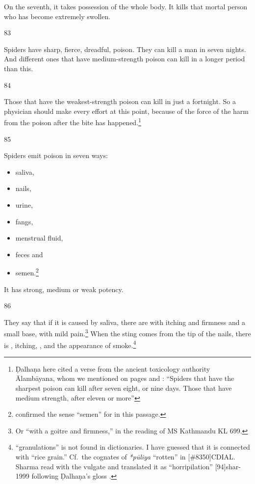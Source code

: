 \begin{translation}
On the seventh, it takes possession of the whole body. It kills that mortal person 
who has become extremely swollen. 
    
\item[83]

Spiders have sharp, fierce, dreadful,   poison.  They can kill a man in seven 
nights.
And different ones that have medium-strength poison can kill in a longer period 
than this. 
    
\item[84]

Those that have the weakest-strength poison can kill in just a
fortnight.  So a physician should make every effort at this point,
because of the force of the harm from the poison after the bite has
happened.\footnote{Ḍalhaṇa here cited a verse from the ancient
    toxicology authority Ālambāyana, whom we mentioned on pages
    \pageref{alambayana1} and \pageref{alambayana2} \citep[591]{vulgate}:
     “Spiders that have the sharpest poison can
    kill after seven eight, or nine days.  Those that have medium
    strength, after eleven or more”}

\item[85]

Spiders emit poison in seven ways:
\begin{itemize}
    \item saliva,
    \item nails,
    \item urine,
    \item fangs,
    \item menstrual fluid,
    \item feces
    and 
    \item semen.\footnote{ confirmed the sense “semen” 
    for  in this passage.}
\end{itemize}
It has strong, medium or weak potency.

\item[86]

They say that if it is caused by saliva, there are 
with itching and firmness and a small base, with mild
pain.\footnote{Or “with a goitre and firmness,” in the reading of MS
    Kathmandu KL 699.}  When the sting comes from the tip of the nails,
    there is , itching, ,
    and the appearance of smoke.\footnote{ “granulations” is
        not found in dictionaries. I have guessed that it is connected with
         “rice grain.” Cf.\ the cognates of \emph{*pūliya}
        “rotten” in [\#8350]{CDIAL}. Sharma read 
        with the vulgate and translated it as “horripilation”
        [94]{shar-1999} following Ḍalhaṇa's gloss 
        \cite[592]{vulgate}.}
        

\end{translation}
